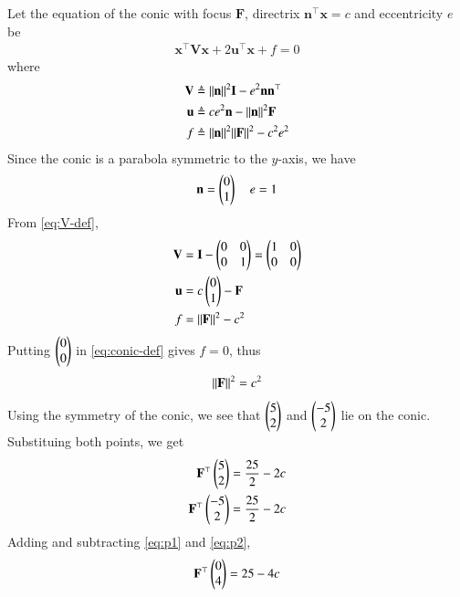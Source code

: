 \documentclass[journal,12pt,twocolumn]{IEEEtran}
\renewcommand{\vec}[1]{\boldsymbol{\mathbf{#1}}}
\begin{document}
\begin{enumerate}
    \solution Let the equation of the conic with focus $\vec{F}$, directrix
    $\vec{n}^\top\vec{x} = c$ and eccentricity $e$ be
    \begin{align}
        \vec{x}^\top\vec{V}\vec{x} + 2\vec{u}^\top\vec{x} + f = 0
        \label{eq:conic-def}
    \end{align}
    where
    \begin{align}
        \vec{V} &\triangleq \norm{\vec{n}}^2\vec{I} - e^2\vec{n}\vec{n}^\top \label{eq:V-def} \\
        \vec{u} &\triangleq ce^2\vec{n} - \norm{\vec{n}}^2\vec{F} \label{eq:u-def} \\
        f &\triangleq \norm{\vec{n}}^2\norm{\vec{F}}^2 - c^2e^2 \label{eq:f-def}
    \end{align}
    Since the conic is a parabola symmetric to the $y$-axis, we have
    \begin{align}
        \vec{n} = \myvec{0\\1} \quad e = 1
    \end{align}
    From \eqref{eq:V-def},
    \begin{align}
        \vec{V} &= \vec{I} - \myvec{0&0\\0&1} = \myvec{1&0\\0&0} \\
        \vec{u} &= c\myvec{0\\1} - \vec{F} \\
        f &= \norm{\vec{F}}^2 - c^2
    \end{align}
    Putting $\begin{pmatrix}0\\0\end{pmatrix}$ in \eqref{eq:conic-def} gives $f = 0$, thus 
    \begin{align}
        \norm{\vec{F}}^2 = c^2
        \label{eq:F-c}
    \end{align}
    Using the symmetry of the conic, we see that $\begin{pmatrix}5\\2\end{pmatrix}$ and 
    $\begin{pmatrix}-5\\2\end{pmatrix}$ lie on the conic. Substituing both points, we get
    \begin{align}
        \vec{F}^\top\myvec{5\\2} &= \frac{25}{2} - 2c \label{eq:p1} \\
        \vec{F}^\top\myvec{-5\\2} &= \frac{25}{2} - 2c \label{eq:p2}
    \end{align}
    Adding and subtracting \eqref{eq:p1} and \eqref{eq:p2},
    \begin{align}
        \vec{F}^\top\myvec{0\\4} &= 25 - 4c \\

\end{align}
\end{enumerate}
\end{document}
